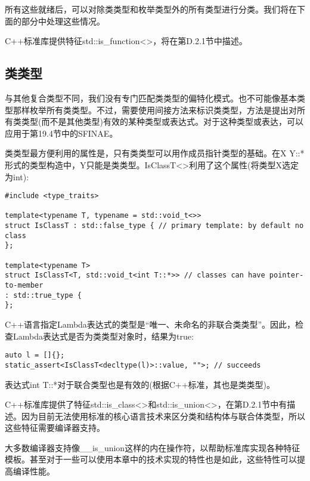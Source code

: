 所有这些就绪后，可以对除类类型和枚举类型外的所有类型进行分类。我们将在下面的部分中处理这些情况。

C++标准库提供特征std::is\_function<>，将在第D.2.1节中描述。

\subsection{类类型}

与其他复合类型不同，我们没有专门匹配类类型的偏特化模式。也不可能像基本类型那样枚举所有类类型。不过，需要使用间接方法来标识类类型，方法是提出对所有类类型(而不是其他类型)有效的某种类型或表达式。对于这种类型或表达，可以应用于第19.4节中的SFINAE。

类类型最方便利用的属性是，只有类类型可以用作成员指针类型的基础。在X Y::*形式的类型构造中，Y只能是类类型。IsClassT<>利用了这个属性(将类型X选定为int):

\begin{lstlisting}[style=styleCXX]
#include <type_traits>

template<typename T, typename = std::void_t<>>
struct IsClassT : std::false_type { // primary template: by default no class
};

template<typename T>
struct IsClassT<T, std::void_t<int T::*>> // classes can have pointer-to-member
: std::true_type {
};
\end{lstlisting}

C++语言指定Lambda表达式的类型是“唯一、未命名的非联合类类型”。因此，检查Lambda表达式是否为类类型对象时，结果为true:

\begin{lstlisting}[style=styleCXX]
auto l = []{};
static_assert<IsClassT<decltype(l)>::value, "">; // succeeds
\end{lstlisting}

表达式int T::*对于联合类型也是有效的(根据C++标准，其也是类类型)。

C++标准库提供了特征std::is\_class<>和std::is\_union<>，在第D.2.1节中有描述。因为目前无法使用标准的核心语言技术来区分类和结构体与联合体类型，所以这些特征需要编译器支持。

\begin{tcolorbox}[colback=webgreen!5!white,colframe=webgreen!75!black]
\hspace*{0.75cm}大多数编译器支持像\_\_is\_union这样的内在操作符，以帮助标准库实现各种特征模板。甚至对于一些可以使用本章中的技术实现的特性也是如此，这些特性可以提高编译性能。
\end{tcolorbox}

